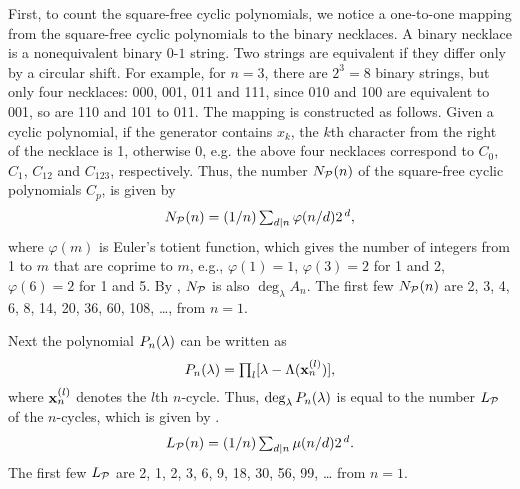 \documentclass{ws-ijbc}
\begin{document}
First, to count the square-free cyclic polynomials,
  we notice a one-to-one mapping
  from the square-free cyclic polynomials
  to the binary necklaces.
%
A binary necklace
  is a nonequivalent binary $0$-$1$ string.
%
Two strings are equivalent if they differ only by a circular shift.
%
For example, for $n = 3$, there are $2^3 = 8$ binary strings,
but only four necklaces: 000, 001, 011 and 111,
since 010 and 100 are equivalent to 001,
so are 110 and 101 to 011.
%
The mapping is constructed as follows.
%
Given a cyclic polynomial, if the generator contains $x_k$,
  the $k$th character from the right of the necklace is 1,
  otherwise 0,
e.g. the above four necklaces correspond to
  $C_0$, $C_1$, $C_{12}$ and $C_{123}$, respectively.
Thus,
%
the number $N_\mathcal P(n)$ of the square-free cyclic polynomials $C_p$,
  is given by \cite{riordan}
\begin{equation}
  N_\mathcal P(n) = (1/n) \textstyle\sum_{d|n} \varphi(n/d) 2^{\,d},
\label{eq:necklace}
\end{equation}
%
%
where $\varphi(m)$ is Euler's totient function,
which gives the number of integers from 1 to $m$
  that are coprime to $m$,
  e.g.,
  $\varphi(1) = 1$,
  $\varphi(3) = 2$ for 1 and 2,
  $\varphi(6) = 2$ for 1 and 5.
By ,
  $N_\mathcal P$ is also $\deg_\lambda A_n$.
The first few $N_\mathcal P(n)$ are
2, 3, 4, 6, 8, 14, 20, 36, 60, 108, \dots, %
  from $n = 1$.





Next the polynomial $P_n(\lambda)$ can be written as
\begin{equation}
  P_n(\lambda) = \textstyle\prod_l [\lambda - \Lambda(\mathbf{x}_{n}^{(l)})],
\end{equation}
where $\mathbf{x}_{n}^{(l)}$ denotes the $l$th $n$-cycle.
%
Thus, $\deg_\lambda P_n(\lambda)$
  is equal to the number $L_\mathcal P$ of the $n$-cycles,
  which is given by
  \cite{hao, hao2, lutzky}.
\begin{equation}
  L_\mathcal P(n) = (1/n)\textstyle\sum_{d | n} \mu(n/d) 2^{\,d}.
\label{eq:lyndon}
\end{equation}
%
%
%
The first few $L_\mathcal P$ are
2, 1, 2, 3, 6, 9, 18, 30, 56, 99, \dots %
from $n = 1$.
\end{document}

